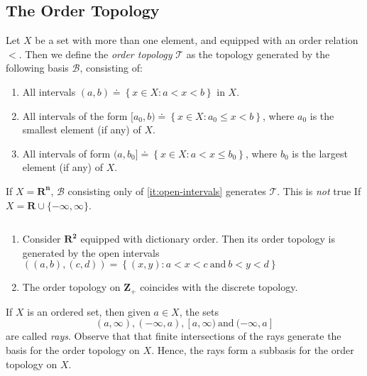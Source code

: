 \subsection{The Order Topology}
\begin{definition}
	\label{def:order_top}
	Let $X$ be a set with more than one element, and equipped with an order
	relation $<$. Then we define the \emph{order topology} $\mathcal{T}$ as the topology
	generated by the following basis $\mathcal{B}$, consisting of:
	\begin{enumerate}
		\item\label{it:open-intervals} All intervals $(a,b) \doteq \left\{ x \in X:
				a < x < b
			\right\}$ in $X$.
		\item\label{it:ray1} All intervals of the form $[a_{0}, b) \doteq \left\{
			x \in X: a_{0} \le x < b \right\}$, where $a_{0}$
			is the smallest element (if any) of $X$.
		\item\label{it:ray2} All intervals of form $(a, b_{0}] \doteq \left\{
			x \in X: a < x \le b_{0} \right\}$,
			where $b_{0}$ is the largest
			element (if any) of $X$.
	\end{enumerate}
\end{definition}
\begin{remark}
	\label{rem:rr-top}
	If $X = \mathbf{R^{n}}$, $\mathcal{B}$ consisting only of \cref{it:open-intervals}
	generates $\mathcal{T}$. This is \emph{not} true If $X =
	\mathbf{R} \cup
	\{-\infty, \infty\}$.
\end{remark}
\begin{example}
	$ $
	\begin{enumerate}
		\item Consider $\mathbf{R^{2}}$ equipped with dictionary
			order. Then its order topology is generated by the open intervals
			$\left( (a,b), (c,d) \right) = \left\{ (x,y): a < x < c \ \text{and} \ b <
			y < d\right\}$
		\item The order topology on $\mathbf{Z}_{+}$ coincides with the discrete topology.
	\end{enumerate}
\end{example}
\begin{definition}
	\label{def:rays-subbasis}
	If $X$ is an ordered set, then given $a \in X$, the sets
	\begin{equation*}
		(a, \infty), (-\infty, a), [a, \infty) \ \text{and} \  (-\infty, a]
	\end{equation*}
	are called \emph{rays}. Observe that that finite intersections of the
	rays generate the basis for the order topology on $X$. Hence, the rays form a subbasis for the order topology on $X$.
\end{definition}
